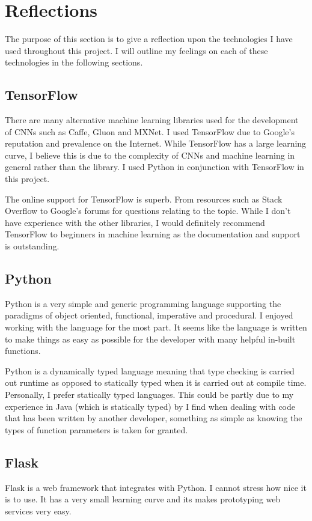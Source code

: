 \section{Reflections}
The purpose of this section is to give a reflection upon the technologies I have used throughout this project.
I will outline my feelings on each of these technologies in the following sections.

\tocless\subsection{TensorFlow}
There are many alternative machine learning libraries used for the development of CNNs such as Caffe, Gluon and MXNet.
I used TensorFlow due to Google's reputation and prevalence on the Internet.
While TensorFlow has a large learning curve, I believe this is due to the complexity of CNNs and machine learning in general rather than the library.
I used Python in conjunction with TensorFlow in this project.

The online support for TensorFlow is superb.
From resources such as Stack Overflow to Google's forums for questions relating to the topic.
While I don't have experience with the other libraries, I would definitely recommend TensorFlow to beginners in machine learning as the documentation and support is outstanding.

\tocless\subsection{Python}
Python is a very simple and generic programming language supporting the paradigms of object oriented, functional, imperative and procedural.
I enjoyed working with the language for the most part.
It seems like the language is written to make things as easy as possible for the developer with many helpful in-built functions.

Python is a dynamically typed language meaning that type checking is carried out runtime as opposed to statically typed when it is carried out at compile time.
Personally, I prefer statically typed languages.
This could be partly due to my experience in Java (which is statically typed) by I find when dealing with code that has been written by another developer, something as simple as knowing the types of function parameters is taken for granted.

\tocless\subsection{Flask}
Flask is a web framework that integrates with Python.
I cannot stress how nice it is to use.
It has a very small learning curve and its makes prototyping web services very easy.

